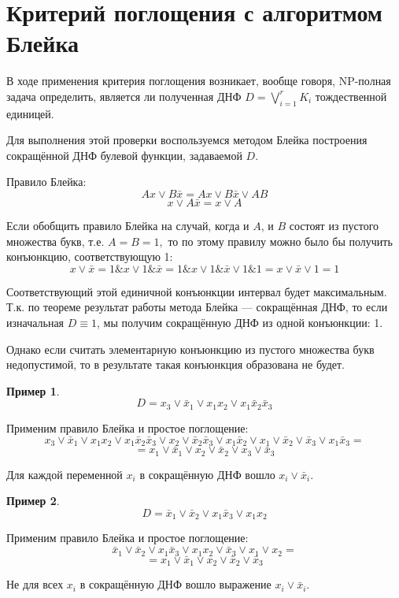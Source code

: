 \documentclass[12pt,a4paper,oneside,fleqn,leqno]{article}
\theoremstyle{definition}
\newtheorem{example}{Пример}[section]
\begin{document}
	\section{Критерий поглощения с алгоритмом Блейка}
		В ходе применения критерия поглощения возникает, вообще говоря, NP-полная задача определить, является ли полученная ДНФ $D = \bigvee\limits_{i = 1}^rK_i$ тождественной единицей.\par
		Для выполнения этой проверки воспользуемся методом Блейка построения сокращённой ДНФ булевой функции, задаваемой $D.$\par
		Правило Блейка:
		$$
			Ax \vee B\bar{x} = Ax \vee B\bar{x} \vee AB
		$$
		$$
			x \vee A\bar{x} = x \vee A
		$$\par
		Если обобщить правило Блейка на случай, когда и $A$, и $B$ состоят из пустого множества букв, т.е. $A = B = 1,$ то по этому правилу можно было бы получить конъюнкцию, соответствующую 1:
		$$
			x \vee \bar{x} = 1\& x \vee 1\&\bar{x} = 1 \& x \vee 1\&\bar{x} \vee 1 \& 1 = x \vee \bar{x} \vee 1 = 1
		$$\par
		Соответствующий этой единичной конъюнкции интервал будет максимальным. Т.к. по теореме результат работы метода Блейка --- сокращённая ДНФ, то если изначальная $D \equiv 1$, мы получим сокращённую ДНФ из одной конъюнкции: 1.\par
		Однако если считать элементарную конъюнкцию из пустого множества букв недопустимой, то в результате такая конъюнкция образована не будет.
		\begin{example}
			$$
				D = x_3 \vee \bar{x}_1 \vee x_1x_2 \vee x_1\bar{x}_2\bar{x}_3
			$$\par
			Применим правило Блейка и простое поглощение:
			$$
				x_3 \vee \bar{x}_1 \vee x_1x_2 \vee x_1\bar{x}_2\bar{x}_3 \vee x_2 \vee \bar{x}_2\bar{x}_3 \vee x_1\bar{x}_2 \vee x_1 \vee \bar{x}_2 \vee \bar{x}_3 \vee x_1\bar{x}_3 =
			$$
			$$
				= x_1 \vee \bar{x}_1 \vee x_2 \vee \bar{x}_2 \vee x_3 \vee \bar{x}_3
			$$\par
			Для каждой переменной $x_i$ в сокращённую ДНФ вошло $x_i \vee \bar{x}_i.$
		\end{example}
		\begin{example}
			$$
				D = \bar{x}_1 \vee \bar{x}_2 \vee x_1\bar{x}_3 \vee x_1x_2
			$$\par
			Применим правило Блейка и простое поглощение:
			$$
				\bar{x}_1 \vee \bar{x}_2 \vee x_1\bar{x}_3 \vee x_1x_2 \vee \bar{x}_3 \vee x_1 \vee x_2 =
			$$
			$$
				= x_1 \vee \bar{x}_1  \vee x_2 \vee \bar{x}_2 \vee \bar{x}_3
			$$\par
			Не для всех $x_i$ в сокращённую ДНФ вошло выражение $x_i \vee \bar{x}_i.$
		\end{example}
\end{document}
